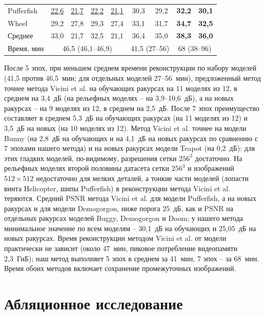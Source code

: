 \begin{table}[ht]
\begin{tabular}{lcccccccc}
        Pufferfish & \underline{22,6} & \underline{21,7} & \underline{22,2} & \underline{21,1} & 30,3 & 29,2 & \textbf{32,2} & \textbf{30,1} \\
        Wheel & 29,2 & 27,8 & 29,3 & 27,4 & 33,1 & 31,7 & \textbf{34,7} & \textbf{32,5} \\
        \midrule
        Среднее & 33,0 & 21,7 & 32,5 & 21,1 & 36,4 & 35,0 & \textbf{38,3} & \textbf{36,0} \\
        \midrule
        Время, мин & \multicolumn{4}{c}{46,5 (46,1--46,9)} & \multicolumn{2}{c}{41,5 (27--56)} & \multicolumn{2}{c}{68 (38--96)} \\
        \bottomrule
    \end{tabular}
\end{table}

После 5 эпох, при меньшем среднем времени реконструкции по набору моделей (41,5 против 46,5~мин; для отдельных моделей 27--56~мин), предложенный метод точнее метода Vicini et al. на обучающих ракурсах на 11 моделях из 12, в среднем на 3,4~дБ (на рельефных моделях -- на 3,9--10,6~дБ), а на новых ракурсах -- на 9 моделях из 12, в среднем на 2,5~дБ. После 7 эпох преимущество составляет в среднем 5,3~дБ на обучающих ракурсах (на 11 моделях из 12) и 3,5~дБ на новых (на 10 моделях из 12). Метод Vicini et al. точнее на модели Bunny (на 2,8~дБ на обучающих и на 4,1~дБ на новых ракурсах по сравнению с 7 эпохами нашего метода) и на новых ракурсах модели Teapot (на 0,2~дБ): для этих гладких моделей, по-видимому, разрешения сетки $256^3$ достаточно. На рельефных моделях второй половины датасета сетки $256^3$ и изображений $512\times512$ недостаточно для мелких деталей, а тонкие части моделей (лопасти винта Helicopter, шипы Pufferfish) в реконструкции метода Vicini et al. теряются. Средний PSNR метода Vicini et al. для модели Pufferfish, а на новых ракурсах и для модели Demogorgon, ниже порога 25~дБ, как и PSNR на отдельных ракурсах моделей Buggy, Demogorgon и Doom; у нашего метода минимальное значение по всем моделям -- 30,1~дБ на обучающих и 25,05~дБ на новых ракурсах. Время реконструкции методом Vicini et al. от модели практически не зависит (около 47~мин, пиковое потребление видеопамяти 2,3~ГиБ); наш метод выполняет 5 эпох в среднем за 41~мин, 7 эпох -- за 68~мин. Время обоих методов включает сохранение промежуточных изображений.

\section{Абляционное исследование}

